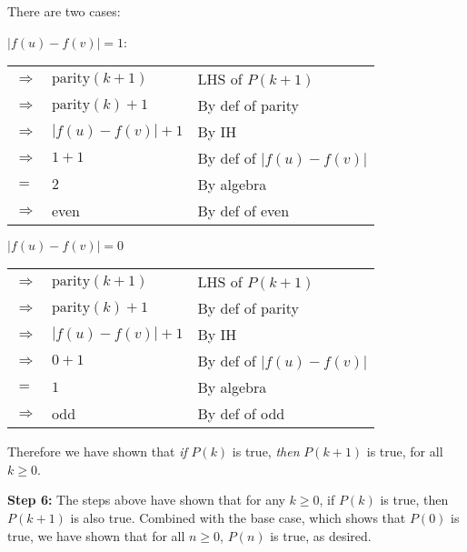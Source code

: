 \documentclass{article}
\begin{document}
There are two cases:

$|f(u)-f(v)|=1$:

\begin{adjustwidth}{1.5cm}{}
	\begin{sloppypar}
	\begin{tabular}{l l l}
		$\Rightarrow$ & $\text{parity}(k+1)$ & LHS of $P(k+1)$ \\
		$\Rightarrow$ & $\text{parity}(k)+1$ & By def of parity \\
		$\Rightarrow$ & $|f(u)-f(v)|+1$ & By IH \\
		$\Rightarrow$ & $1+1$ & By def of $|f(u)-f(v)|$ \\
		$=$ & $2$ & By algebra \\
		$\Rightarrow$ & even & By def of even \\
	\end{tabular}
\end{sloppypar}
\end{adjustwidth}\vspace{15pt}



$|f(u)-f(v)|=0$

\begin{adjustwidth}{1.5cm}{}
	\begin{sloppypar}
	\begin{tabular}{l l l}
		$\Rightarrow$ & $\text{parity}(k+1)$ & LHS of $P(k+1)$ \\
		$\Rightarrow$ & $\text{parity}(k)+1$ & By def of parity \\
		$\Rightarrow$ & $|f(u)-f(v)|+1$ & By IH \\
		$\Rightarrow$ & $0+1$ & By def of $|f(u)-f(v)|$ \\
		$=$ & $1$ & By algebra \\
		$\Rightarrow$ & odd & By def of odd \\
	\end{tabular}
\end{sloppypar}
\end{adjustwidth}\vspace{10pt}

Therefore we have shown that \textit{if} $P(k)$ is true, \textit{then} $P(k+1)$ is true, for all $k\geq 0$. \vspace{10pt}


\noindent\textbf{Step 6:} The steps above have shown that for any $k\geq 0$, if $P(k)$ is true, then $P(k+1)$ is also true. Combined with the base case, which shows that $P(0)$ is true, we have shown that for all $n\geq 0$, $P(n)$ is true, as desired. \vspace{10pt}
\pagebreak
\end{document}
